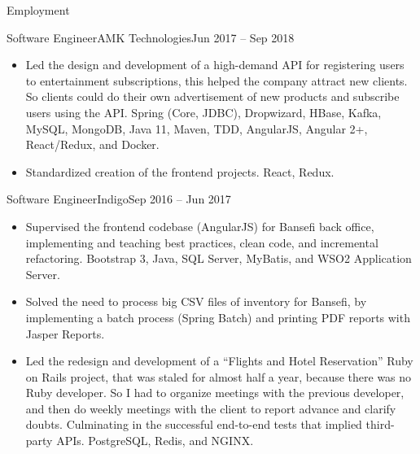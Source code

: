 \documentclass[calibri]{../mcdowell-cv/mcdowellcv}
\begin{document}
\begin{cvsection}{Employment}
		\begin{cvsubsection}{Software Engineer}{AMK Technologies}{Jun 2017 -- Sep 2018}
			\begin{itemize}
				\item Led the design and development of a high-demand API for registering users to entertainment subscriptions, this helped the company attract new clients. So clients could do their own advertisement of new products and subscribe users using the API. Spring (Core, JDBC), Dropwizard, HBase, Kafka, MySQL, MongoDB, Java 11, Maven, TDD, AngularJS, Angular 2+, React/Redux, and Docker.
				\item Standardized creation of the frontend projects. React, Redux.
			\end{itemize}
		\end{cvsubsection}

        \pagebreak

		\begin{cvsubsection}{Software Engineer}{Indigo}{Sep 2016 -- Jun 2017}		
			\begin{itemize}
				\item Supervised the frontend codebase (AngularJS) for Bansefi back office, implementing and teaching best practices, clean code, and incremental refactoring. Bootstrap 3, Java, SQL Server, MyBatis, and WSO2 Application Server.
				\item Solved the need to process big CSV files of inventory for Bansefi, by implementing a batch process (Spring Batch) and printing PDF reports with Jasper Reports.
				\item Led the redesign and development of a ``Flights and Hotel Reservation'' Ruby on Rails project, that was staled for almost half a year, because there was no Ruby developer. So I had to organize meetings with the previous developer, and then do weekly meetings with the client to report advance and clarify doubts. Culminating in the successful end-to-end tests that implied third-party APIs. PostgreSQL, Redis, and NGINX.
			\end{itemize}
		\end{cvsubsection}


\end{cvsection}
\end{document}
